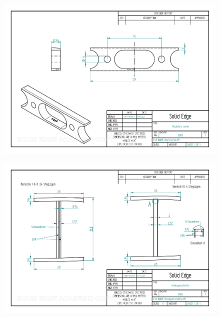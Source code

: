 \begin{figure}[h]
	\includegraphics[angle=90, scale=0.85]{PDFs/KlotzVorne.pdf}
	\centering
\end{figure}
\begin{figure}[h]
	\includegraphics[angle=90, scale=0.85]{PDFs/Holmquerschnitte.pdf}
	\centering
\end{figure}

